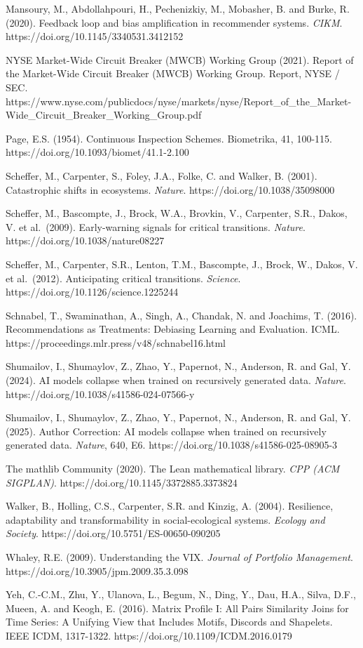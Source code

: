 \documentclass[
  11pt,
]{article}
\begin{document}
Mansoury, M., Abdollahpouri, H., Pechenizkiy, M., Mobasher, B. and
Burke, R. (2020). Feedback loop and bias amplification in recommender
systems. \emph{CIKM}. https://doi.org/10.1145/3340531.3412152

NYSE Market-Wide Circuit Breaker (MWCB) Working Group (2021). Report of
the Market-Wide Circuit Breaker (MWCB) Working Group. Report, NYSE /
SEC.
https://www.nyse.com/publicdocs/nyse/markets/nyse/Report\_of\_the\_Market-Wide\_Circuit\_Breaker\_Working\_Group.pdf

Page, E.S. (1954). Continuous Inspection Schemes. Biometrika, 41,
100-115. https://doi.org/10.1093/biomet/41.1-2.100

Scheffer, M., Carpenter, S., Foley, J.A., Folke, C. and Walker, B.
(2001). Catastrophic shifts in ecosystems. \emph{Nature}.
https://doi.org/10.1038/35098000

Scheffer, M., Bascompte, J., Brock, W.A., Brovkin, V., Carpenter, S.R.,
Dakos, V. et al.~(2009). Early-warning signals for critical transitions.
\emph{Nature}. https://doi.org/10.1038/nature08227

Scheffer, M., Carpenter, S.R., Lenton, T.M., Bascompte, J., Brock, W.,
Dakos, V. et al.~(2012). Anticipating critical transitions.
\emph{Science}. https://doi.org/10.1126/science.1225244

Schnabel, T., Swaminathan, A., Singh, A., Chandak, N. and Joachims, T.
(2016). Recommendations as Treatments: Debiasing Learning and
Evaluation. ICML. https://proceedings.mlr.press/v48/schnabel16.html

Shumailov, I., Shumaylov, Z., Zhao, Y., Papernot, N., Anderson, R. and
Gal, Y. (2024). AI models collapse when trained on recursively generated
data. \emph{Nature}. https://doi.org/10.1038/s41586-024-07566-y

Shumailov, I., Shumaylov, Z., Zhao, Y., Papernot, N., Anderson, R. and
Gal, Y. (2025). Author Correction: AI models collapse when trained on
recursively generated data. \emph{Nature}, 640, E6.
https://doi.org/10.1038/s41586-025-08905-3

The mathlib Community (2020). The Lean mathematical library. \emph{CPP
(ACM SIGPLAN)}. https://doi.org/10.1145/3372885.3373824

Walker, B., Holling, C.S., Carpenter, S.R. and Kinzig, A. (2004).
Resilience, adaptability and transformability in social-ecological
systems. \emph{Ecology and Society}.
https://doi.org/10.5751/ES-00650-090205

Whaley, R.E. (2009). Understanding the VIX. \emph{Journal of Portfolio
Management}. https://doi.org/10.3905/jpm.2009.35.3.098

Yeh, C.-C.M., Zhu, Y., Ulanova, L., Begum, N., Ding, Y., Dau, H.A.,
Silva, D.F., Mueen, A. and Keogh, E. (2016). Matrix Profile I: All Pairs
Similarity Joins for Time Series: A Unifying View that Includes Motifs,
Discords and Shapelets. IEEE ICDM, 1317-1322.
https://doi.org/10.1109/ICDM.2016.0179
\end{document}
